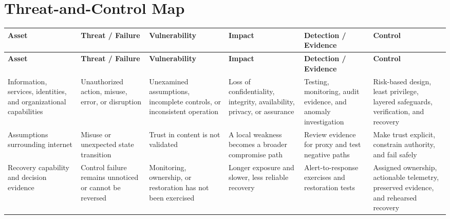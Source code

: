 \documentclass[11pt,letterpaper]{article}
\begin{document}
\section*{Threat-and-Control Map}
\begingroup\scriptsize\setlength{\tabcolsep}{2pt}
\begin{longtable}{>{\raggedright\arraybackslash}p{}>{\raggedright\arraybackslash}p{}>{\raggedright\arraybackslash}p{}>{\raggedright\arraybackslash}p{}>{\raggedright\arraybackslash}p{}>{\raggedright\arraybackslash}p{}}
\toprule\rowcolor{Navy}\color{white}\textbf{Asset} & \color{white}\textbf{Threat / Failure} & \color{white}\textbf{Vulnerability} & \color{white}\textbf{Impact} & \color{white}\textbf{Detection / Evidence} & \color{white}\textbf{Control}\\\midrule
\endfirsthead
\toprule\rowcolor{Navy}\color{white}\textbf{Asset} & \color{white}\textbf{Threat / Failure} & \color{white}\textbf{Vulnerability} & \color{white}\textbf{Impact} & \color{white}\textbf{Detection / Evidence} & \color{white}\textbf{Control}\\\midrule
\endhead
Information, services, identities, and organizational capabilities & Unauthorized action, misuse, error, or disruption & Unexamined assumptions, incomplete controls, or inconsistent operation & Loss of confidentiality, integrity, availability, privacy, or assurance & Testing, monitoring, audit evidence, and anomaly investigation & Risk-based design, least privilege, layered safeguards, verification, and recovery\\\midrule
Assumptions surrounding internet & Misuse or unexpected state transition & Trust in content is not validated & A local weakness becomes a broader compromise path & Review evidence for proxy and test negative paths & Make trust explicit, constrain authority, and fail safely\\\midrule
Recovery capability and decision evidence & Control failure remains unnoticed or cannot be reversed & Monitoring, ownership, or restoration has not been exercised & Longer exposure and slower, less reliable recovery & Alert-to-response exercises and restoration tests & Assigned ownership, actionable telemetry, preserved evidence, and rehearsed recovery\\\midrule
\bottomrule
\end{longtable}
\endgroup
\end{document}
